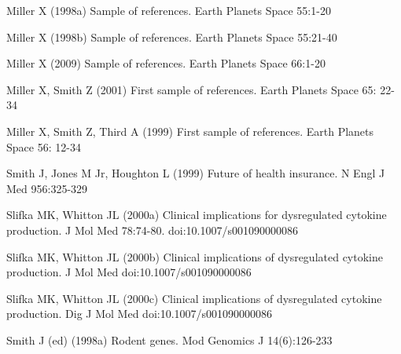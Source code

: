 \documentclass{EPS}
\begin{document}
\begin{thebibliography}{}
Miller X (1998a) Sample of references. Earth Planets Space 55:1-20

Miller X (1998b) Sample of references. Earth Planets Space 55:21-40

Miller X (2009) Sample of references. Earth Planets Space 66:1-20

Miller X, Smith Z (2001) First sample of references.
Earth Planets Space 65: 22-34

Miller X, Smith Z, Third A (1999) First sample of references.
Earth Planets Space 56: 12-34

Smith J, Jones M Jr, Houghton L (1999)
Future of health insurance.
N Engl J Med 956:325-329

Slifka MK, Whitton JL (2000a)
Clinical implications for dysregulated cytokine production.
J Mol Med 78:74-80. doi:10.1007/s001090000086

Slifka MK, Whitton JL (2000b)
Clinical implications of dysregulated cytokine production.
J Mol Med doi:10.1007/s001090000086

Slifka MK, Whitton JL (2000c)
Clinical implications of dysregulated cytokine production.
Dig J Mol Med doi:10.1007/s001090000086

Smith J (ed) (1998a)
Rodent genes. Mod Genomics J 14(6):126-233


\end{thebibliography}
\end{document}
